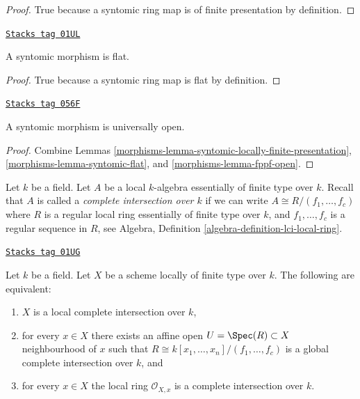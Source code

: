 \begin{proof}
True because a syntomic ring map is of finite presentation by
definition.
\end{proof}

\begin{lemma}
\label{morphisms-lemma-syntomic-flat}
\href{https://stacks.math.columbia.edu/tag/01UL}{\texttt{Stacks tag 01UL}}

A syntomic morphism is flat.
\end{lemma}

\begin{proof}
True because a syntomic ring map is flat by definition.
\end{proof}

\begin{lemma}
\label{morphisms-lemma-syntomic-open}
\href{https://stacks.math.columbia.edu/tag/056F}{\texttt{Stacks tag 056F}}

A syntomic morphism is universally open.
\end{lemma}

\begin{proof}

Combine
Lemmas \ref{morphisms-lemma-syntomic-locally-finite-presentation},
\ref{morphisms-lemma-syntomic-flat}, and
\ref{morphisms-lemma-fppf-open}.
\end{proof}

Let $k$ be a field. Let $A$ be a local $k$-algebra essentially
of finite type over $k$. Recall that $A$ is called a
{\it complete intersection over $k$} if we can write
$A \cong R/(f_1, \ldots, f_c)$ where $R$ is a regular local ring
essentially of finite type over $k$, and $f_1, \ldots, f_c$ is
a regular sequence in $R$, see
Algebra, Definition \ref{algebra-definition-lci-local-ring}.

\begin{lemma}
\label{morphisms-lemma-local-complete-intersection}
\href{https://stacks.math.columbia.edu/tag/01UG}{\texttt{Stacks tag 01UG}}

Let $k$ be a field.
Let $X$ be a scheme locally of finite type over $k$.
The following are equivalent:
\begin{enumerate}
\item $X$ is a local complete intersection over $k$,
\item for every $x \in X$ there exists an affine open
$U = \Spec(R) \subset X$ neighbourhood of $x$
such that $R \cong k[x_1, \ldots, x_n]/(f_1, \ldots, f_c)$
is a global complete intersection over $k$, and
\item for every $x \in X$ the local ring $\mathcal{O}_{X, x}$
is a complete intersection over $k$.
\end{enumerate}
\end{lemma}

